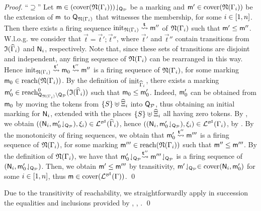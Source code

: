 \begin{textAtEnd}[category=proofs]
\begin{proof}
  \vspace*{\baselineskip}
  \noindent``$\supseteq$'' Let
  $\mathsf{m}\in{\left(\mathrm{cover}({\mathfrak{N}({\Gamma_i})})\right)}\!\downharpoonleft_{\mathsf{Q}_{\mathcal{P}}}$
  be a marking and $\mathsf{m}' \in \mathrm{cover}({\mathfrak{N}({\Gamma_i})})$ be the
  extension of $\mathsf{m}$ to $\mathsf{Q}_{\mathfrak{N}({\Gamma_i})}$ that
  witnesses the membership, for some $i \in {[{1},{n}]}$. Then there
  exists a firing sequence $\mathrm{init}_{\mathfrak{N}({\Gamma_i})}
  \stackrel{\mathbf{t}}{\leadsto} \mathsf{m}''$ of $\mathfrak{N}({\Gamma_i})$ such that $\mathsf{m}'
  \leq \mathsf{m}''$. W.l.o.g. we consider that $\vec{t} =
  \vec{t}';\vec{t}''$, where $\vec{t}'$ and $\vec{t}''$ contain
  transitions from $\mathfrak{I}({\widehat{\Gamma}_i})$ and $\mathsf{N}_i$,
  respectively. Note that, since these sets of transitions are
  disjoint and independent, any firing sequence of
  $\mathfrak{N}({\Gamma_i})$ can be rearranged in this way. Hence
  $\mathrm{init}_{\mathfrak{N}({\Gamma_i})} \stackrel{\mathbf{t}'}{\leadsto} \mathsf{m}_0
  \stackrel{\mathbf{t}''}{\leadsto} \mathsf{m}''$ is a firing sequence of
  $\mathfrak{N}({\Gamma_i})$, for some marking $\mathsf{m}_0 \in
  \mathrm{reach}({\mathfrak{N}({\Gamma_i})})$. By the definition of
  $\mathrm{init}_{\widehat{\Gamma}_i}$, there exists a marking
  $\mathsf{m}'_0\in\mathrm{reach}^0_{\mathsf{Q}_{\mathfrak{N}({\Gamma_i})}
    \setminus \mathsf{Q}_{\mathcal{P}}}({\mathfrak{I}({\widehat{\Gamma}_i})})$ such
  that $\mathsf{m}_0 \leq \mathsf{m}'_0$. Indeed, $\mathsf{m}'_0$ can be obtained
  from $\mathsf{m}_0$ by moving the tokens from ${\{ {S} \}} \uplus
  \widehat{\Xi}_i$ into $\mathsf{Q}_{\mathcal{P}}$, thus obtaining an
  initial marking for $\mathsf{N}_i$, extended with the places ${\{ {S} \}}
  \uplus \widehat{\Xi}_i$ all having zero tokens.  By
  , we obtain
  $((\mathsf{N}_i,{\mathsf{m}'_0}\!\downharpoonleft_{\mathsf{Q}_{\mathcal{P}}}),\xi_i) \in
  \mathcal{L}_{}^{\scriptscriptstyle{{\mathcal{B}}^\sharp}}({\widehat{\Gamma}_i})$, hence
  $((\mathsf{N}_i,{\mathsf{m}'_0}\!\downharpoonleft_{\mathsf{Q}_{\mathcal{P}}}),\xi_i) \in
  \mathcal{L}_{}^{\scriptscriptstyle{{\mathcal{B}}^\sharp}}({\Gamma_i})$, by
  . By the monotonicity of firing sequences,
  we obtain that $\mathsf{m}'_0 \stackrel{\mathbf{t}''}{\leadsto} \mathsf{m}'''$ is a firing
  sequence of $\mathfrak{N}({\Gamma_i})$, for some marking $\mathsf{m}''' \in
  \mathrm{reach}({\mathfrak{N}({\Gamma_i})})$ such that $\mathsf{m}'' \leq \mathsf{m}'''$.
  By the definition of $\mathfrak{N}({\Gamma_i})$, we have that
  ${\mathsf{m}'_0}\!\downharpoonleft_{\mathsf{Q}_{\mathcal{P}}} \stackrel{\mathbf{t}''}{\leadsto}
  {\mathsf{m}'''}\!\downharpoonleft_{\mathsf{Q}_{\mathcal{P}}}$ is a firing sequence of
  $(\mathsf{N}_i,{\mathsf{m}'_0}\!\downharpoonleft_{\mathsf{Q}_{\mathcal{P}}})$.  Then, we obtain
  $\mathsf{m}' \leq \mathsf{m}'''$ by transitivity,
  \ie ${\mathsf{m}'}\!\downharpoonleft_{\mathsf{Q}_{\mathcal{P}}} \in \mathrm{cover}({\mathsf{N}_i,\mathsf{m}'_0})$
  for some $i\in{[{1},{n}]}$, thus
  $\mathsf{m}\in\mathrm{cover}({\mathcal{L}_{}^{\scriptscriptstyle{{\mathcal{B}}^\sharp}}({\Gamma})})$. \qed
\end{proof}
\begin{proofSketch}
  Due to the transitivity of reachability,
  we straightforwardly apply in succession the equalities and inclusions provided by
  , , . 
  \qed
\end{proofSketch}
\ifLongVersion\else
\end{textAtEnd}
\fi


